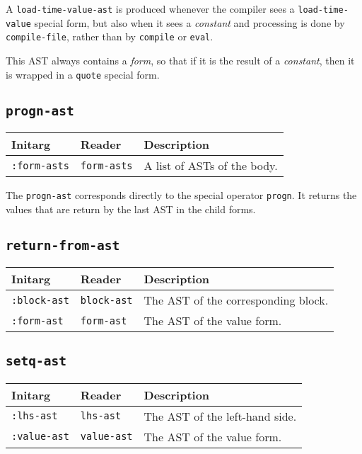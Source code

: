 A \texttt{load-time-value-ast} is produced whenever the compiler sees
a \texttt{load-time-value} special form, but also when it sees a
\emph{constant} and processing is done by \texttt{compile-file},
rather than by \texttt{compile} or \texttt{eval}.  

This AST always contains a \emph{form}, so that if it is the result of
a \emph{constant}, then it is wrapped in a \texttt{quote} special
form. 

\subsection{\texttt{progn-ast}}
\label{progn-ast}

\begin{tabular}{|l|l|l|}
\hline
Initarg & Reader & Description\\
\hline\hline
\texttt{:form-asts} & \texttt{form-asts} & A list of ASTs of the body.\\
\hline
\end{tabular}

The \texttt{progn-ast} corresponds directly to the \cl{} special
operator \texttt{progn}.  It returns the values that are return by the
last AST in the child forms.

\subsection{\texttt{return-from-ast}}
\label{return-from-ast}

\begin{tabular}{|l|l|l|}
\hline
Initarg & Reader & Description\\
\hline\hline
\texttt{:block-ast} & \texttt{block-ast} & The AST of the
corresponding block.\\
\hline
\texttt{:form-ast} & \texttt{form-ast} & The AST of the value form.\\
\hline
\end{tabular}

\subsection{\texttt{setq-ast}}
\label{setq-ast}

\begin{tabular}{|l|l|l|}
\hline
Initarg & Reader & Description\\
\hline\hline
\texttt{:lhs-ast} & \texttt{lhs-ast} & The AST of the left-hand side.\\
\hline
\texttt{:value-ast} & \texttt{value-ast} & The AST of the value form.\\
\hline
\end{tabular}


